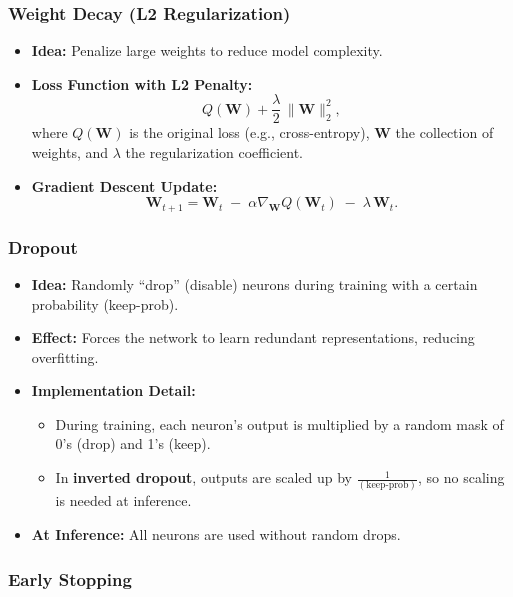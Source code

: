 \documentclass{article}
\begin{document}
\subsubsection{Weight Decay (L2 Regularization)}

\begin{itemize}
    \item \textbf{Idea:} Penalize large weights to reduce model complexity.
    \item \textbf{Loss Function with L2 Penalty:}
    \[
    Q(\mathbf{W}) + \frac{\lambda}{2}\,\|\mathbf{W}\|_{2}^{2},
    \]
    where $Q(\mathbf{W})$ is the original loss (e.g., cross-entropy), $\mathbf{W}$ the collection of weights, and $\lambda$ the regularization coefficient.
    \item \textbf{Gradient Descent Update:} 
    \[
    \mathbf{W}_{t+1} = \mathbf{W}_t \;-\;\alpha \nabla_{\mathbf{W}} Q(\mathbf{W}_t)\;-\;\lambda\,\mathbf{W}_t.
    \]
\end{itemize}

\subsubsection{Dropout}

\begin{itemize}
    \item \textbf{Idea:} Randomly ``drop'' (disable) neurons during training with a certain probability (keep-prob).
    \item \textbf{Effect:} Forces the network to learn redundant representations, reducing overfitting. 
    \item \textbf{Implementation Detail:} 
    \begin{itemize}
        \item During training, each neuron's output is multiplied by a random mask of 0's (drop) and 1's (keep).
        \item In \textbf{inverted dropout}, outputs are scaled up by $\frac{1}{(\text{keep-prob})}$, so no scaling is needed at inference.
    \end{itemize}
    \item \textbf{At Inference:} All neurons are used without random drops.
\end{itemize}

\subsubsection{Early Stopping}
\end{document}
